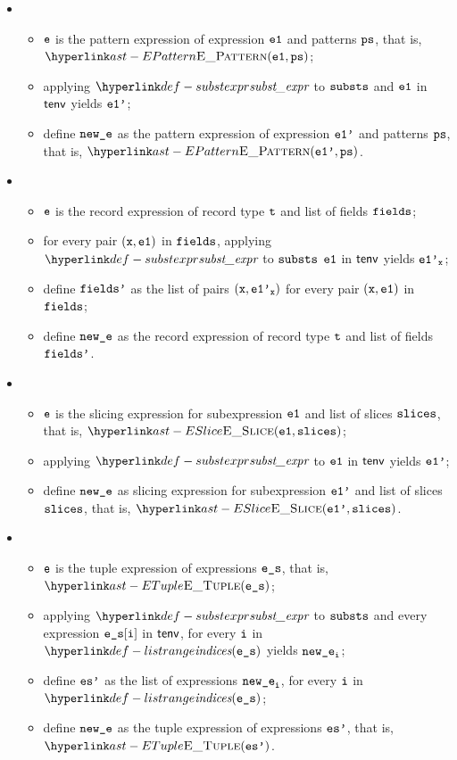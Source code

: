 \begin{itemize}
  \item {}
  \begin{itemize}
    \item $\texttt{e}$ is the pattern expression of expression $\texttt{e1}$ and patterns $\texttt{ps}$, that is, \\
          $\EPattern(\veone, \vps)$;
    \item applying $\substexpr$ to $\texttt{substs}$ and $\texttt{e1}$ in $\textsf{tenv}$ yields $\texttt{e1'}$;
    \item define $\texttt{new\_e}$ as the pattern expression of expression $\texttt{e1'}$ and patterns $\texttt{ps}$, that is, $\EPattern(\veonep, \vps)$.
  \end{itemize}

  \item {}
  \begin{itemize}
    \item $\texttt{e}$ is the record expression of record type $\texttt{t}$ and list of fields $\texttt{fields}$;
    \item for every pair $(\texttt{x},\texttt{e1})$ in $\texttt{fields}$, applying $\substexpr$ to $\texttt{substs}$ $\texttt{e1}$ in $\textsf{tenv}$ yields $\texttt{e1'}_{\texttt{x}}$;
    \item define $\texttt{fields'}$ as the list of pairs $(\texttt{x},\texttt{e1'}_{\texttt{x}})$ for every pair $(\texttt{x},\texttt{e1})$ in $\texttt{fields}$;
    \item define $\texttt{new\_e}$ as the record expression of record type $\texttt{t}$ and list of fields $\texttt{fields'}$.
  \end{itemize}

  \item {}
  \begin{itemize}
    \item $\texttt{e}$ is the slicing expression for subexpression $\texttt{e1}$ and list of slices $\texttt{slices}$, that is, $\ESlice(\veone, \vslices)$;
    \item applying $\substexpr$ to $\texttt{e1}$ in $\textsf{tenv}$ yields $\texttt{e1'}$;
    \item define $\texttt{new\_e}$ as slicing expression for subexpression $\texttt{e1'}$ and list of slices \\
          $\texttt{slices}$, that is, $\ESlice(\veonep, \vslices)$.
  \end{itemize}

  \item {}
  \begin{itemize}
    \item $\texttt{e}$ is the tuple expression of expressions $\texttt{e\_s}$, that is, $\ETuple(\ves)$;
    \item applying $\substexpr$ to $\texttt{substs}$ and every expression $\texttt{e\_s}[\texttt{i}]$ in $\textsf{tenv}$, for every $\texttt{i}$ in $\listrange(\ves)$
          yields $\texttt{new\_e}_{\texttt{i}}$;
    \item define $\texttt{es'}$ as the list of expressions $\texttt{new\_e}_{\texttt{i}}$, for every $\texttt{i}$ in $\listrange(\ves)$;
    \item define $\texttt{new\_e}$ as the tuple expression of expressions $\texttt{es'}$, that is, $\ETuple(\vesp)$.
  \end{itemize}


\end{itemize}
